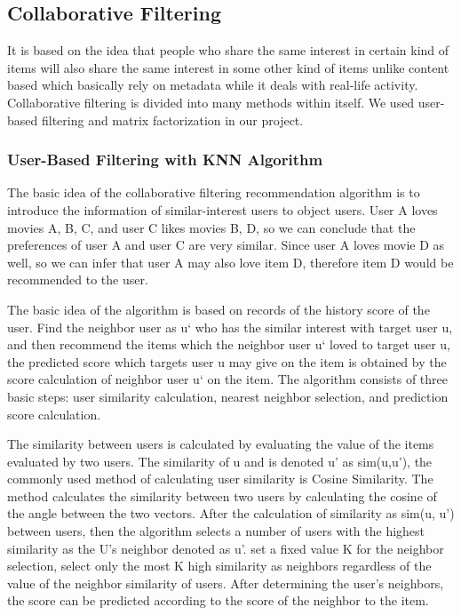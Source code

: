 \documentclass[onecolumn]{article}
\begin{document}
\subsection{Collaborative Filtering}
\hspace{0.5cm}It is based on the idea that people who share the same interest in certain kind of items will also share the same interest in some other kind of items unlike content based which basically rely on metadata while it deals with real-life activity. Collaborative filtering is divided into many methods within itself. We used user-based filtering and matrix factorization in our project.
\hfill

\subsubsection{User-Based Filtering with KNN Algorithm}
\hspace{0.5cm}The basic idea of the collaborative filtering recommendation algorithm is to introduce the information of similar-interest users to object users. User A loves movies A, B, C, and user C likes movies B, D, so we can conclude that the preferences of user A and user C are very similar. Since user A loves movie D as well, so we can infer that user A may also love item D, therefore item D would be recommended to the user.

\vspace{4mm}

The basic idea of the algorithm is based on records of the history score of the user. Find the neighbor user as u` who has the similar interest with target user u, and then recommend the items which the neighbor user u` loved to target user u, the predicted score which targets user u may give on the item is obtained by the score calculation of neighbor user u` on the item. The algorithm consists of three basic steps: user similarity calculation, nearest neighbor selection, and prediction score calculation.

\vspace{4mm}

The similarity between users is calculated by evaluating the value of the items evaluated by two users. The similarity of u and is denoted u' as sim(u,u'), the commonly used method of calculating user similarity is Cosine Similarity. The method calculates the similarity between two users by calculating the cosine of the angle between the two vectors.
After the calculation of similarity as sim(u, u') between users, then the algorithm selects a number of users with the highest similarity as the U’s neighbor denoted as u'. set a fixed value K for the neighbor selection, select only the most K high similarity as neighbors regardless of the value of the neighbor similarity of users. After determining the user's neighbors, the score can be predicted according to the score of the neighbor to the item.
\end{document}
